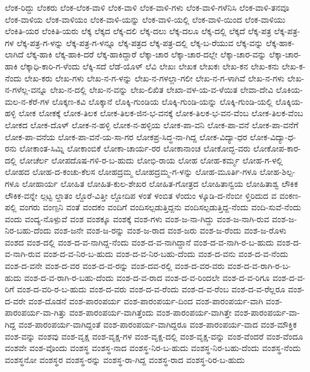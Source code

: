 ಲೆಂಕ-ರಿದ್ದು
ಲೆಂಕರು
ಲೆಂಕ-ಲೆಂಕ-ವಾಳಿ
ಲೆಂಕ-ವಾಳಿ
ಲೆಂಕ-ವಾಳಿ-ಗಳು
ಲೆಂಕ-ವಾಳಿ-ಗಳೆನಿಸಿ
ಲೆಂಕ-ವಾಳಿ-ತನವೂ
ಲೆಂಕ-ವಾಳಿಯ
ಲೆಂಕ-ವಾಳಿಯಂ
ಲೆಂಕ-ವಾಳಿ-ಯನ್ನು
ಲೆಂಕ-ವಾಳಿ-ಯಲ್ಲಿ
ಲೆಂಕ-ವಾಳಿ-ಯಿಂದ
ಲೆಂಕ-ವಾಳಿಯು
ಲೆಂಕಿತಿ-ಯರ
ಲೆಂಕಿತಿ-ಯರು
ಲೆಕ್ಕ
ಲೆಕ್ಕದ
ಲೆಕ್ಕ-ದಲಿ
ಲೆಕ್ಕ-ದಲು
ಲೆಕ್ಕ-ದಲೂ
ಲೆಕ್ಕ-ದಲ್ಲಿ
ಲೆಕ್ಕದೆ
ಲೆಕ್ಕ-ಪತ್ರ
ಲೆಕ್ಕ-ಪತ್ರ-ಗಳ
ಲೆಕ್ಕ-ಪತ್ರ-ಗ-ಳನ್ನು
ಲೆಕ್ಕ-ಪತ್ರ-ಗ-ಳನ್ನೂ
ಲೆಕ್ಕ-ಪತ್ರದ
ಲೆಕ್ಕ-ಪತ್ರ-ದಲ್ಲಿ
ಲೆಕ್ಕ-ಬ-ರೆಯುವ
ಲೆಕ್ಕ-ವನ್ನು
ಲೆಕ್ಕ-ಹಾಕ-ಲಾಗಿದೆ
ಲೆಕ್ಕ-ಹಾಕಿ
ಲೆಕ್ಕ-ಹಾಕಿ-ದರೆ
ಲೆಕ್ಕ-ಹಾಕಿದ್ದಾರೆ
ಲೆಕ್ಕಾ-ಚಾರ
ಲೆಕ್ಕಾ-ಚಾರ-ದಲ್ಲೇ
ಲೆಕ್ಕಾ-ಚಾರ-ವನ್ನು
ಲೆಕ್ಕಾ-ಚಾರ-ಹಾಕಿ
ಲೆಕ್ಕಾಧಿ-ಕಾರಿ-ಗ-ಳೆಂದು
ಲೆಕ್ಕಿ-ಸದೆ
ಲೆಡೆ-ಯೊಳ್
ಲೆವಿ
ಲೇಖಃ
ಲೇಖಕ
ಲೇಖಕಃ
ಲೇಖ-ಕನ
ಲೇಖ-ಕನು
ಲೇಖ-ಕ-ನೆಂದು
ಲೇಖ-ಕರು
ಲೇಖ-ಗಳು
ಲೇಖ-ನ-ಗ-ಳನ್ನು
ಲೇಖ-ನ-ಗಳಲ್ಲಾ-ಗಲೀ
ಲೇಖ-ನ-ಗ-ಳಾಗಿವೆ
ಲೇಖ-ನ-ಗಳು
ಲೇಖ-ನ-ಗಳೆಲ್ಲ-ವನ್ನೂ
ಲೇಖ-ನ-ದಲ್ಲಿ
ಲೇಖ-ನ-ವನ್ನು
ಲೇಖ-ಲಿಖಿತ
ಲೇಖಾ-ವಳ-ಯ-ವ-ಳೆಯಿತ
ಲೇವಾ-ದೇವಿ
ಲೊಕಿಯ-ಮಲ-ನ-ಕೆರೆ-ಗಳ
ಲೊಕ್ಕಣ-ಕವಿ
ಲೊಕ್ಕಾನೆ
ಲೊಕ್ಕಿ-ಗುಂಡಿಯ
ಲೊಕ್ಕಿ-ಗುಂಡಿ-ಯನ್ನು
ಲೊಕ್ಕಿ-ಗುಂಡಿ-ಯಲ್ಲಿ
ಲೊಕ್ಕಿಯ-ಹಳ್ಳಿ
ಲೋಕ
ಲೋಕಕ್ಕೆ
ಲೋಕ-ತಿಲಕ
ಲೋಕ-ತಿಲಕ-ಜಿನ-ಭ-ವನಕ್ಕೆ
ಲೋಕ-ತಿಲಕ-ಭ-ವನ-ವೆಂಬ
ಲೋಕ-ತಿಲಕ-ವೆಂಬ
ಲೋಕದ
ಲೋಕ-ದೊಳ್
ಲೋಕ-ನ-ಹಳ್ಳಿ
ಲೋಕ-ನ-ಹಳ್ಳಿಯ
ಲೋಕ-ಪಾ-ವನಿ
ಲೋಕ-ಪಾ-ವನೆ
ಲೋಕ-ಪಾ-ವನೆಗೆ
ಲೋಕ-ಪಾ-ವನೆಯ
ಲೋಕ-ಪಾ-ವನೆ-ಯ-ಸಾ-ಗರ
ಲೋಕಪ್ರ-ಸಿದ್ಧ-ನಾ-ಗಿದ್ದ
ಲೋಕ-ವಿದ್ಯಾ-ಧರ
ಲೋಕ-ವಿದ್ಯಾ-ಧ-ರನು
ಲೋಕಾಂತ-ಸಿಮ್ನಿ
ಲೋಕಾಂಬಿಕೆ
ಲೋಕಾ-ಚಾರ್ಯ-ರರ
ಲೋಕಾನಾಂಚ
ಲೋಕೋದ್ಭ-ವರು
ಲೋಕೋಪ-ಕಾರ-ದಲ್ಲಿ
ಲೋಚೆರ್ಲ
ಲೋಪದೊಷ-ಗಳಿ-ರ-ಬ-ಹುದು
ಲೋಭಿ-ರಾಯ
ಲೋಹ
ಲೋಹ-ಕರ್ಮ್ಮ
ಲೋಹ-ಗ-ಳಲ್ಲಿ
ಲೋಹದ
ಲೋಹ-ದ-ಕಂಚು-ಕೆಲಸ
ಲೋಹದ್ರಮ್ಮ
ಲೋಹದ್ರಮ್ಮ-ಗ-ಳನ್ನು
ಲೋಹ-ಮೂರ್ತಿ-ಗಳೂ
ಲೋಹ-ಶಿಲ್ಪ-ಗಳೂ
ಲೋಹಾರ್ಯ
ಲೋಹಿತ
ಲೋಹಿತ-ಕುಲ-ಶೇಖರ
ಲೋಹಿತ-ಗೋತ್ರದ
ಲೋಹಿತಾನ್ವಯ
ಲೋಹಿತಾಶ್ವ
ಲೌಕಿಕ
ಲೌಕಿಕ-ವನ್ನೇ
ಲ್ಗಟ್ಟ
ಲ್ದಾತಂ
ಲ್ದೊರೆ-ವಿತ್ತೀ
ಲ್ದೋದಿಪ
ಳಂತೆ
ಳಂಬಿತ
ಳೆಂದುಂ
ಳ್ಕೂಡಿ-ದ-ನೆಂಬೀ
ಳ್ತಿರಿದುದ
ವ
ವಂಕಣ-ಪಲ್ಲಿ
ವಂಗರು
ವಂಣ್ಪನಿ
ವಂತೆ
ವಂದಕಂ
ವಂದಿಗೆ
ವಂದಿಸಲ್ಪಡುತ್ತಿದ್ದನು
ವಂದಿಸಲ್ಪಡುತ್ತಿದ್ದ-ನೆಂದು
ವಂದಿ-ಸುವೆ-ನೆಂದು
ವಂದು
ವಂದ್ಯ-ನೊಳ್ಪುವೆ
ವಂಶ
ವಂಶಕ್ಕೂ
ವಂಶಕ್ಕೆ
ವಂಶ-ಗಳು
ವಂಶ-ಜ-ನಾ-ಗಿದ್ದು
ವಂಶ-ಜ-ನಾಗಿ-ರುವ
ವಂಶ-ಜ-ನಿರ-ಬಹು-ದೆಂದು
ವಂಶ-ಜನೇ
ವಂಶ-ಜ-ರನ್ನು
ವಂಶ-ಜ-ರಾದ
ವಂಶ-ಜರು
ವಂಶ-ಜ-ರೆಂದು
ವಂಶ-ಜ-ರೊಳು
ವಂಶದ
ವಂಶ-ದಲ್ಲಿ
ವಂಶ-ದ-ವ-ನಾಗಿದ್ದ-ನೆಂದು
ವಂಶ-ದ-ವ-ನಾಗಿದ್ದಾನೆ
ವಂಶ-ದ-ವ-ನಾಗಿ-ರ-ಬ-ಹುದು
ವಂಶ-ದ-ವ-ನಾಗಿ-ರುವ
ವಂಶ-ದ-ವ-ನಿರ-ಬ-ಹುದು
ವಂಶ-ದ-ವ-ನಿರ-ಬಹು-ದೆಂದು
ವಂಶ-ದ-ವನು
ವಂಶ-ದ-ವ-ನೆಂದು
ವಂಶ-ದ-ವನೇ
ವಂಶ-ದ-ವರ
ವಂಶ-ದ-ವ-ರನ್ನು
ವಂಶ-ದವ-ರಲ್ಲಿ
ವಂಶ-ದ-ವರ-ವರು
ವಂಶ-ದ-ವ-ರಾಗಿ-ರ-ಬ-ಹುದು
ವಂಶ-ದ-ವ-ರಾಗಿ-ರ-ಬಹು-ದೆಂದು
ವಂಶ-ದ-ವ-ರಾದ
ವಂಶ-ದ-ವ-ರಿಂದಲೇ
ವಂಶ-ದ-ವ-ರಿಗೂ
ವಂಶ-ದ-ವ-ರಿಗೆ
ವಂಶ-ದ-ವರಿ-ರ-ಬ-ಹುದು
ವಂಶ-ದ-ವರು
ವಂಶ-ದ-ವ-ರೆಂದು
ವಂಶ-ದ-ವ-ರೆಂಬ
ವಂಶ-ದ-ವ-ರೆಲ್ಲರೂ
ವಂಶ-ದ-ವರೇ
ವಂಶ-ದೊಡನೆ
ವಂಶ-ಪಾರಂಪರ್ಯ
ವಂಶ-ಪಾರಂಪರ್ಯ-ದಿಂದ
ವಂಶ-ಪಾರಂಪರ್ಯ-ವಾಗಿ
ವಂಶ-ಪಾರಂಪರ್ಯ-ವಾ-ಗಿತ್ತು
ವಂಶ-ಪಾರಂಪರ್ಯ-ವಾಗಿತ್ತೆಂದು
ವಂಶ-ಪಾರಂಪರ್ಯ-ವಾಗಿತ್ತೇ
ವಂಶ-ಪಾರಂಪರ್ಯ-ವಾ-ಗಿದ್ದ
ವಂಶ-ಪಾರಂಪರ್ಯ-ವಾಗಿದ್ದಂತೆ
ವಂಶ-ಪಾರಂಪರ್ಯ-ವಾಗಿದ್ದರೂ
ವಂಶ-ಪಾರಂಪರ್ಯ-ವಾದ
ವಂಶ-ಮೌಕ್ತಿಕ
ವಂಶ-ವನ್ನು
ವಂಶವು
ವಂಶ-ವೃಕ್ಷ
ವಂಶ-ವೃಕ್ಷ-ಗಳ
ವಂಶ-ವೃಕ್ಷ-ದಲ್ಲಿ
ವಂಶ-ವೃಕ್ಷ-ವನ್ನು
ವಂಶ-ವೆಂದರೆ
ವಂಶ-ವೆಂದೂ
ವಂಶವೇ
ವಂಶ-ವೊಂದು
ವಂಶಸ್ಥ
ವಂಶಸ್ಥ-ನಾದ
ವಂಶಸ್ಥ-ನಿರ-ಬ-ಹುದು
ವಂಶಸ್ಥ-ನಿರ-ಬಹು-ದೆಂದು
ವಂಶಸ್ಥ-ನೆಂದು
ವಂಶಸ್ಥನೋ
ವಂಶಸ್ಥರ
ವಂಶಸ್ಥ-ರನ್ನು
ವಂಶಸ್ಥ-ರಾ-ಗಿದ್ದ
ವಂಶಸ್ಥ-ರಾದ
ವಂಶಸ್ಥ-ರಿರ-ಬ-ಹುದು
